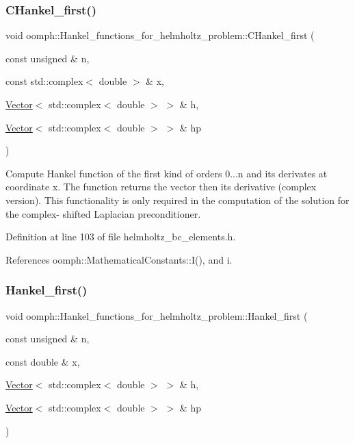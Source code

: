 \subsubsection{\texorpdfstring{C\+Hankel\+\_\+first()}{CHankel\_first()}}
{\footnotesize\ttfamily void oomph\+::\+Hankel\+\_\+functions\+\_\+for\+\_\+helmholtz\+\_\+problem\+::\+C\+Hankel\+\_\+first (\begin{DoxyParamCaption}\item[{const unsigned \&}]{n,  }\item[{const std\+::complex$<$ double $>$ \&}]{x,  }\item[{\hyperlink{classoomph_1_1Vector}{Vector}$<$ std\+::complex$<$ double $>$ $>$ \&}]{h,  }\item[{\hyperlink{classoomph_1_1Vector}{Vector}$<$ std\+::complex$<$ double $>$ $>$ \&}]{hp }\end{DoxyParamCaption})}

Compute Hankel function of the first kind of orders 0...n and its derivates at coordinate x. The function returns the vector then its derivative (complex version). This functionality is only required in the computation of the solution for the complex-\/ shifted Laplacian preconditioner. 

Definition at line 103 of file helmholtz\+\_\+bc\+\_\+elements.\+h.



References oomph\+::\+Mathematical\+Constants\+::\+I(), and i.

\mbox{\label{namespaceoomph_1_1Hankel__functions__for__helmholtz__problem_a89d572e5352a2da98d19260165385f6f}} 
\subsubsection{\texorpdfstring{Hankel\+\_\+first()}{Hankel\_first()}}
{\footnotesize\ttfamily void oomph\+::\+Hankel\+\_\+functions\+\_\+for\+\_\+helmholtz\+\_\+problem\+::\+Hankel\+\_\+first (\begin{DoxyParamCaption}\item[{const unsigned \&}]{n,  }\item[{const double \&}]{x,  }\item[{\hyperlink{classoomph_1_1Vector}{Vector}$<$ std\+::complex$<$ double $>$ $>$ \&}]{h,  }\item[{\hyperlink{classoomph_1_1Vector}{Vector}$<$ std\+::complex$<$ double $>$ $>$ \&}]{hp }\end{DoxyParamCaption})}

